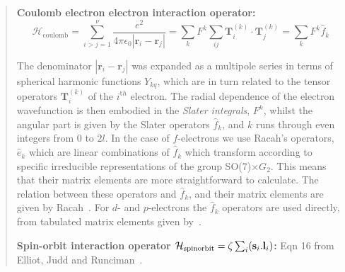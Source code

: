 \begin{quotation}
\item[\bf Coulomb electron electron interaction operator:]
\[ \mathcal{H}_{\mathrm{coulomb}} = \sum_{i>j=1}^\nu \frac{e^2}{4\pi\epsilon_0|\mathbf{r}_i-\mathbf{r}_j|} = 
    \sum_{k} F^k \sum_{ij} {\mathbf T}_i^{(k)} \cdot {\mathbf T}_j^{(k)} = \sum_k F^k \hat f_k \]

\noindent The denominator $|\mathbf{r}_i-\mathbf{r}_j|$ was expanded as a multipole series in terms 
of spherical harmonic functions $Y_{kq}$, which are in turn related to the tensor operators ${\mathbf
T}_i^{(k)}$ of the $i^{\mathrm th}$ electron. The radial dependence of the electron wavefunction is
then embodied in the \emph{Slater integrals}, $F^k$, whilst the angular part is given by the Slater
operators $\hat f_k$, and $k$ runs through even integers from 0 to $2l$. In the case of $f$-electrons 
we use Racah's operators, $\hat e_k$ which are linear combinations of $\hat f_k$ which transform according to
specific irreducible representations of the group SO(7)$\times G_2$. This means that their matrix
elements are more straightforward to calculate. The relation between these operators and $\hat f_k$, and
their matrix elements are given by Racah~\cite{racah49-1352}. For $d$- and $p$-electrons the $\hat f_k$
operators are used directly, from tabulated matrix elements given by~\cite{nielson63-1}. 
%
%
%
\\
\item[\bf Spin-orbit interaction operator $\mathcal H_{\mathrm {spinorbit}}=\zeta \sum_i ({\mathbf s}_i . {\mathbf l}_i)$:]
Eqn 16 from Elliot, Judd and Runciman~\cite{elliot57-509}.
\\



\end{quotation}

